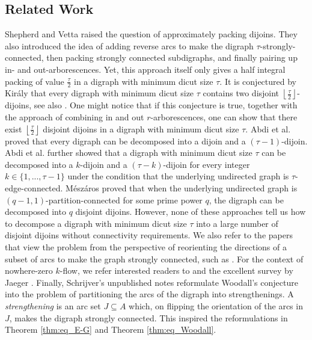 \documentclass[runningheads]{llncs}
\newcommand{\rounddown}[1]{\left\lfloor#1\right\rfloor}
\begin{document}
\subsection*{Related Work}
Shepherd and Vetta \cite{shepherd2005visualizing} raised the question of approximately packing dijoins.
They also introduced the idea of adding reverse arcs to make the digraph $\tau$-strongly-connected, then packing strongly connected subdigraphs, and finally pairing up in- and out-arborescences. 
Yet, this approach itself only gives a half
integral packing of value $\frac{\tau}{2}$ in a digraph with minimum dicut size $\tau$. 
It is conjectured by Kir{\'a}ly \cite{kiraly2007result} that every digraph with minimum dicut size $\tau$ contains two disjoint $\rounddown{\frac{\tau}{2}}$-dijoins, see also \cite{abdi2024arc}. One might notice that if this conjecture is true, together with the approach of combining in and out $r$-arborescences, one can show that there exist $\rounddown{\frac{\tau}{2}}$ disjoint dijoins in a digraph with minimum dicut size $\tau$. 
Abdi et al. \cite{abdi2023packing} proved that every digraph can be decomposed into a dijoin and a $(\tau-1)$-dijoin. Abdi et al. \cite{abdi2024arc} further showed that a digraph with minimum dicut size $\tau$ can be decomposed into a $k$-dijoin and a $(\tau-k)$-dijoin for every integer $k\in\{1,...,\tau-1\}$ under the condition that the underlying undirected graph is $\tau$-edge-connected. M\'esz\'aros \cite{meszaros2015note} proved that when the underlying undirected graph is $(q-1,1)$-partition-connected for some prime power $q$, the digraph can be decomposed into $q$ disjoint dijoins. However, none of these approaches tell us how to decompose a digraph with minimum dicut size $\tau$ into a large number of disjoint dijoins without connectivity requirements. We also refer to the papers that view the problem from the perspective of reorienting the directions of a subset of arcs to make the graph strongly connected, such as \cite{abdi2024arc,chudnovsky2016disjoint,schrijverobervation}. For the context of nowhere-zero $k$-flow, we refer interested readers to \cite{jaeger1976nowhere,jaeger1979flows,jaeger1984circular,lovasz2013nowhere,seymour1981nowhere,thomassen2012weak,younger1983integer} and the excellent survey by Jaeger \cite{jaeger1988nowhere}. 
Finally, Schrijver's unpublished notes \cite{schrijverobervation} reformulate Woodall's conjecture into the problem of partitioning the arcs of the digraph into strengthenings.  A \textit{strengthening} is an arc set $J \subseteq A$ which, on flipping the orientation of the arcs in $J$, makes the digraph strongly connected. This inspired the reformulations in Theorem \ref{thm:eq_E-G} and Theorem \ref{thm:eq_Woodall}.
\end{document}
